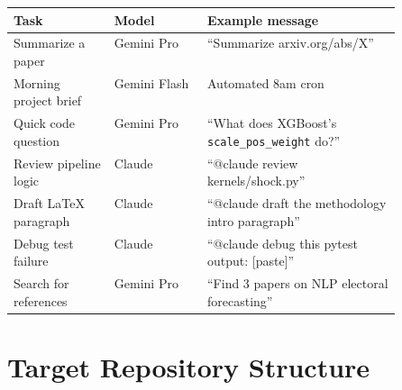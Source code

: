 \documentclass[11pt]{article}
\begin{document}
\begin{center}
\begin{tabularx}{\linewidth}{p{0.26\linewidth}p{0.24\linewidth}X}
\toprule
\textbf{Task} & \textbf{Model} & \textbf{Example message} \\
\midrule
Summarize a paper & Gemini Pro & ``Summarize arxiv.org/abs/X'' \\
Morning project brief & Gemini Flash & Automated 8am cron \\
Quick code question & Gemini Pro & ``What does XGBoost's
\texttt{scale\_pos\_weight} do?'' \\
Review pipeline logic & Claude & ``@claude review kernels/shock.py'' \\
Draft LaTeX paragraph & Claude & ``@claude draft the methodology
intro paragraph'' \\
Debug test failure & Claude & ``@claude debug this pytest output: [paste]'' \\
Search for references & Gemini Pro & ``Find 3 papers on NLP electoral forecasting'' \\
\bottomrule
\end{tabularx}
\end{center}

\section{Target Repository Structure}
\end{document}
